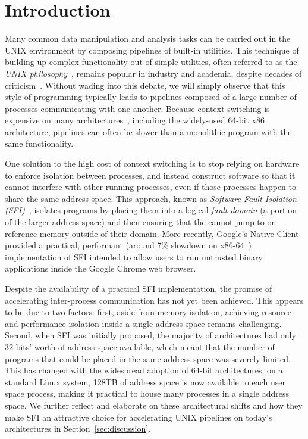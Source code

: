 \section{Introduction}
\label{sec:intro}

Many common data manipulation and analysis tasks can be carried out in
the UNIX environment by composing pipelines of built-in utilities. This
technique of building up complex functionality out of simple utilities,
often referred to as the \emph{UNIX philosophy}~\cite{unixphilosophy},
remains popular in industry and academia, despite decades of
criticism~\cite{unixhaters}. Without wading into this debate, we will
simply observe that this style of programming typically leads to
pipelines composed of a large number of processes communicating with one
another. Because context switching is expensive on many
architectures~\cite{contextswitch}, including the widely-used 64-bit x86
architecture, pipelines can often be slower than a monolithic program
with the same functionality.

One solution to the high cost of context switching is to stop relying on
hardware to enforce isolation between processes, and instead construct
software so that it cannot interfere with other running processes, even
if those processes happen to share the same address space. This
approach, known as \emph{Software Fault Isolation
(SFI)}~\cite{Wahbe:1993}, isolates programs by placing them into a
logical \emph{fault domain} (a portion of the larger address space) and
then ensuring that the cannot jump to or reference memory outside of
their domain. More recently, Google's Native Client~\cite{Yee:2009}
provided a practical, performant (around 7\% slowdown on
x86-64~\cite{Sehr:2010}) implementation of SFI intended to allow users
to run untrusted binary applications inside the Google Chrome web
browser.


Despite the availability of a practical SFI implementation, the promise
of accelerating inter-process communication has not yet been achieved.
This appears to be due to two factors: first, aside from memory
isolation, achieving resource and performance isolation inside a single
address space remains challenging. Second, when SFI was initially
proposed, the majority of architectures had only 32 bits' worth of
address space available, which meant that the number of programs that
could be placed in the same address space was severely limited. This has
changed with the widespread adoption of 64-bit architectures; on a
standard Linux system, 128TB of address space is now available to each
user space process, making it practical to house many processes in a
single address space. We further reflect and elaborate on these
architectural shifts and how they make SFI an attractive choice for
accelerating UNIX pipelines on today's architectures in
Section~\ref{sec:discussion}.

